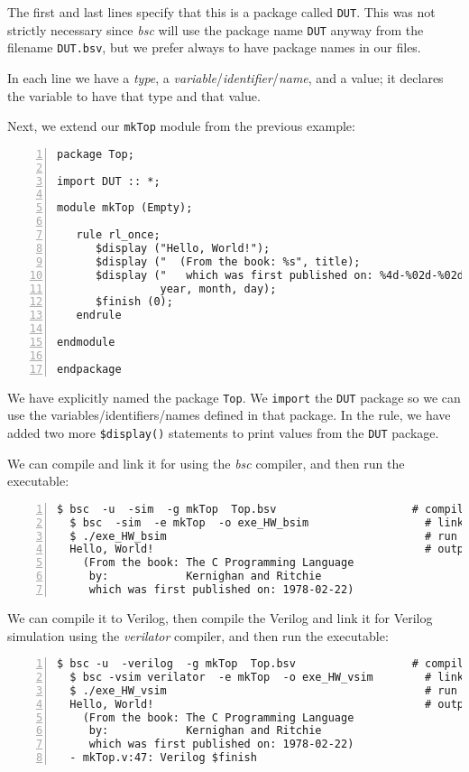The first and last lines specify that this is a package called
\verb|DUT|.  This was not strictly necessary since \emph{bsc} will use
the package name \verb|DUT| anyway from the filename \verb|DUT.bsv|,
but we prefer always to have package names in our files.

In each line we have a \emph{type}, a
\emph{variable}/\emph{identifier}/\emph{name}, and a value; it
declares the variable to have that type and that value.

Next, we extend our \verb|mkTop| module from the previous example:

{\footnotesize
\begin{Verbatim}[frame=single, numbers=left, label=in file Ex\_04\_02/Top.bsv]
package Top;

import DUT :: *;

module mkTop (Empty);

   rule rl_once;
      $display ("Hello, World!");
      $display ("  (From the book: %s", title);
      $display ("   which was first published on: %4d-%02d-%02d)",
                year, month, day);
      $finish (0);
   endrule

endmodule

endpackage
\end{Verbatim}
}

We have explicitly named the package \verb|Top|.  We \verb|import| the
\verb|DUT| package so we can use the variables/identifiers/names
defined in that package.  In the rule, we have added two more
\verb|$display()| statements to print values from the \verb|DUT|
package.

We can compile and link it for {\BLUESIM} using the \emph{bsc} compiler,
and then run the executable:

{\footnotesize
\begin{Verbatim}[frame=single, numbers=left]
  $ bsc  -u  -sim  -g mkTop  Top.bsv                     # compile
  $ bsc  -sim  -e mkTop  -o exe_HW_bsim                  # link
  $ ./exe_HW_bsim                                        # run
  Hello, World!                                          # output
    (From the book: The C Programming Language
     by:            Kernighan and Ritchie
     which was first published on: 1978-02-22)
\end{Verbatim}
}

We can compile it to Verilog, then compile the Verilog and link it for
Verilog simulation using the \emph{verilator} compiler, and then run
the executable:

{\footnotesize
\begin{Verbatim}[frame=single, numbers=left]
  $ bsc -u  -verilog  -g mkTop  Top.bsv                  # compile -> mkTop.v
  $ bsc -vsim verilator  -e mkTop  -o exe_HW_vsim        # link
  $ ./exe_HW_vsim                                        # run
  Hello, World!                                          # output
    (From the book: The C Programming Language
     by:            Kernighan and Ritchie
     which was first published on: 1978-02-22)
  - mkTop.v:47: Verilog $finish
\end{Verbatim}
}

